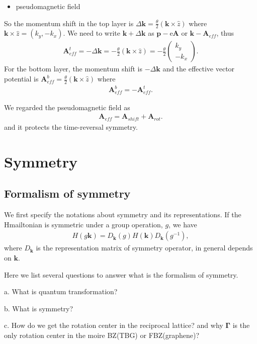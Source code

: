 \documentclass[10pt, oneside]{article}
\newcommand{\te}{\theta}
\newcommand{\mr}[1]{\mathrm{#1}}
\newcommand{\p}[1]{\left(#1\right)}
\begin{document}
\begin{itemize}
	\item pseudomagnetic field
\end{itemize}
So the momentum shift in the top layer is \(\Delta \bm{k} = \frac{\te}{2} \p{\bm{k} \times \hat{z}}\) where \(\bm{k} \times \hat{z} = \p{k_{y}, - k_{x}}\). We need to write \(\bm{k} + \Delta \bm{k}\) as \(\bm{p} - \mr{e} \bm{A}\) or \(\bm{k} - \bm{A}_{eff}\), thus
\begin{align}
	\bm{A}_{eff}^{t} = - \Delta \bm{k} = - \frac{\te}{2} \p{\bm{k} \times \hat{z}} = - \frac{\te}{2} \begin{pmatrix}
		k_{y} \\
		- k_{x}
	\end{pmatrix}.		
\end{align}
For the bottom layer, the momentum shift is \(- \Delta \bm{k}\) and the effective vector potential is \(\bm{A}_{eff}^{b} = \frac{\te}{2} \p{\bm{k} \times \hat{z}}\) where 
\begin{align}
	\bm{A}_{eff}^{b} = - \bm{A}_{eff}^{t}.
\end{align}

We regarded the pseudomagnetic field as 
\begin{align}
	\bm{A}_{eff} = \bm{A}_{shift} + \bm{A}_{rot}.
\end{align}
and it protects the time-reversal symmetry.



\section{Symmetry}
\subsection{Formalism of symmetry}
We first specify the notations about symmetry and its representations. If the Hmailtonian is symmetric under a group operation, \(g\), we have 
\begin{align}
	H\p{g \bm{k}} = D_{\bm{k}} \p{g} H\p{\bm{k}} D_{\bm{k}} \p{g^{-1}},
\end{align}
where \(D_{\bm{k}}\) is the representation matrix of symmetry operator, in general depends on \(\bm{k}\).


Here we list several questions to answer what is the formalism of symmetry.

a. What is quantum transformation?

b. What is symmetry?

c. How do we  get the rotation center in the reciprocal lattice? and why \(\bm{\Gamma}\) is the only rotation center in the moire BZ(TBG) or FBZ(graphene)?
\end{document}
